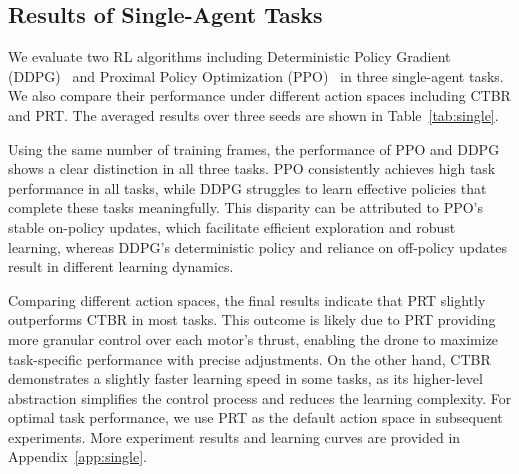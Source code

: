 
\subsection{Results of Single-Agent Tasks}

We evaluate two RL algorithms including Deterministic Policy Gradient (DDPG)~\cite{lillicrap2015continuous} and Proximal Policy Optimization (PPO)~\cite{schulman2017proximal} in three single-agent tasks. We also compare their performance under different action spaces including CTBR and PRT. The averaged results over three seeds are shown in Table~\ref{tab:single}.

Using the same number of training frames, the performance of PPO and DDPG shows a clear distinction in all three tasks. PPO consistently achieves high task performance in all tasks, while DDPG struggles to learn effective policies that complete these tasks meaningfully. This disparity can be attributed to PPO's stable on-policy updates, which facilitate efficient exploration and robust learning, 
whereas DDPG's deterministic policy and reliance on off-policy updates result in different learning dynamics.

Comparing different action spaces, the final results indicate that PRT slightly outperforms CTBR in most tasks. This outcome is likely due to PRT providing more granular control over each motor's thrust, enabling the drone to maximize task-specific performance with precise adjustments. On the other hand, CTBR demonstrates a slightly faster learning speed in some tasks, as its higher-level abstraction simplifies the control process and reduces the learning complexity. For optimal task performance, we use PRT as the default action space in subsequent experiments. More experiment results and learning curves are provided in Appendix~\ref{app:single}.

